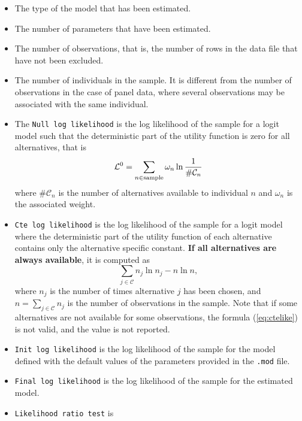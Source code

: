\documentclass[12pt,a4paper]{article}
\newcommand{\req}[1]{(\ref{#1})}
\newcommand{\C}{\mathcal{C}}
\begin{document}
   \begin{itemize}
      \item The type of the model that has been estimated.
      \item The number of parameters that have been estimated.
      \item The number of observations, that is, the number of rows in
        the data file  that have not been excluded.
      \item The number of individuals in the sample. It is different
        from the number of observations in the case of
        panel data, where several observations may be associated with the
        same individual. 
      \item The \lstinline+Null log likelihood+ is the log likelihood
        of the sample for a logit model such that the deterministic
        part of the utility function is zero for all alternatives,
        that is
         \begin{equation}
            \label{eq:l0}
            \mathcal{L}^0 = \sum_{n \in \protect\text{sample}} \omega_n \ln \frac{1}{\# \mathcal{C}_n}
         \end{equation}
         where $\# \mathcal{C}_n$ is the number of alternatives available to
         individual $n$ and $\omega_n$ is the associated weight.
      \item \lstinline+Cte log likelihood+ is the log likelihood of the
sample for a logit model where the  deterministic
        part of the utility function of each alternative contains only 
the alternative specific constant. \textbf{If all alternatives are
always available},  it is computed as
\begin{equation}
\label{eq:ctelike}
\sum_{j \in \C} n_j \ln n_j - n \ln n,
\end{equation}
where $n_j$ is the number of times alternative $j$ has been chosen,
and $n=\sum_{j \in \C} n_j$ is the number of observations in the
sample. Note that if some alternatives are not available for some
observations, the formula \req{eq:ctelike} is not valid, and the value is not reported. 
      \item \lstinline+Init log likelihood+ is the log likelihood of
        the sample for the model defined with the default values of
        the parameters provided in the \lstinline+.mod+ file. 
      \item \lstinline+Final log likelihood+ is the log likelihood of the sample for the estimated model. 
      \item \lstinline+Likelihood ratio test+ is 

\end{itemize}
\end{document}
